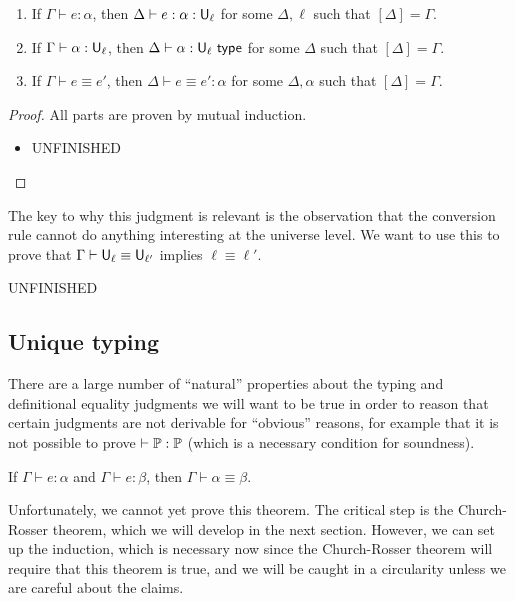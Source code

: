 \begin{lemma}
\begin{enumerate}
\item If $\Gamma\vdash e:\alpha$, then $\Delta\vdash e:\alpha:\U_\ell$ for some $\Delta,\ell$ such that $[\Delta]=\Gamma$.
\item If $\Gamma\vdash \alpha:\U_\ell$, then $\Delta\vdash \alpha:\U_\ell\type$ for some $\Delta$ such that $[\Delta]=\Gamma$.
\item If $\Gamma\vdash e\equiv e'$, then $\Delta\vdash e\equiv e':\alpha$ for some $\Delta,\alpha$ such that $[\Delta]=\Gamma$.
\end{enumerate}
\end{lemma}
\begin{proof}
All parts are proven by mutual induction.
\begin{itemize}
\item UNFINISHED
\end{itemize}
\end{proof}
The key to why this judgment is relevant is the observation that the conversion rule cannot do anything interesting at the universe level. We want to use this to prove that $\Gamma\vdash\U_\ell\equiv\U_{\ell'}$ implies $\ell\equiv\ell'$.

UNFINISHED

\subsection{Unique typing}\label{sec:unique}
There are a large number of ``natural'' properties about the typing and definitional equality judgments we will want to be true in order to reason that certain judgments are not derivable for ``obvious'' reasons, for example that it is not possible to prove $\vdash\P:\P$ (which is a necessary condition for soundness).

\begin{theorem}\label{thm:unique}
If $\Gamma\vdash e:\alpha$ and $\Gamma\vdash e:\beta$, then $\Gamma\vdash\alpha\equiv\beta$.
\end{theorem}

Unfortunately, we cannot yet prove this theorem. The critical step is the Church-Rosser theorem, which we will develop in the next section. However, we can set up the induction, which is necessary now since the Church-Rosser theorem will require that this theorem is true, and we will be caught in a circularity unless we are careful about the claims.

